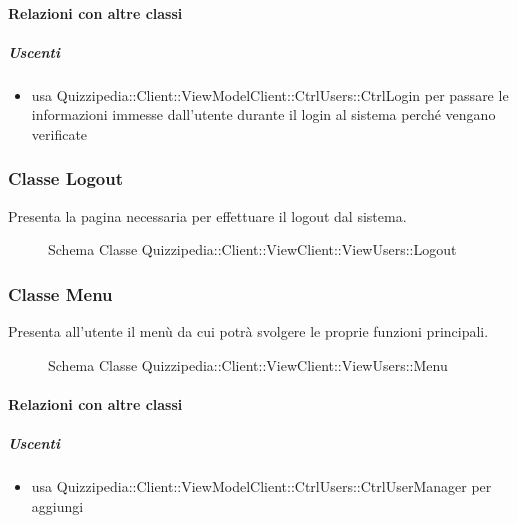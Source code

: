 \paragraph{Relazioni con altre classi}
\subparagraph{Uscenti}
\begin{itemize}
\item usa Quizzipedia::Client::ViewModelClient::CtrlUsers::CtrlLogin per passare le informazioni immesse dall'utente durante il login al sistema perché vengano verificate
\end{itemize}
\subsubsection{Classe Logout}
Presenta la pagina necessaria per effettuare il logout dal sistema.
\begin{figure}[H]
\centering
\noindent{}
\caption[Schema Classe Logout]{Schema Classe Quizzipedia::Client::ViewClient::ViewUsers::Logout}
\end{figure}
\subsubsection{Classe Menu}
Presenta all'utente il menù da cui potrà svolgere le proprie funzioni principali.
\begin{figure}[H]
\centering
\noindent{}
\caption[Schema Classe Menu]{Schema Classe Quizzipedia::Client::ViewClient::ViewUsers::Menu}
\end{figure}
\paragraph{Relazioni con altre classi}
\subparagraph{Uscenti}
\begin{itemize}
\item usa Quizzipedia::Client::ViewModelClient::CtrlUsers::CtrlUserManager per aggiungi
\end{itemize}
